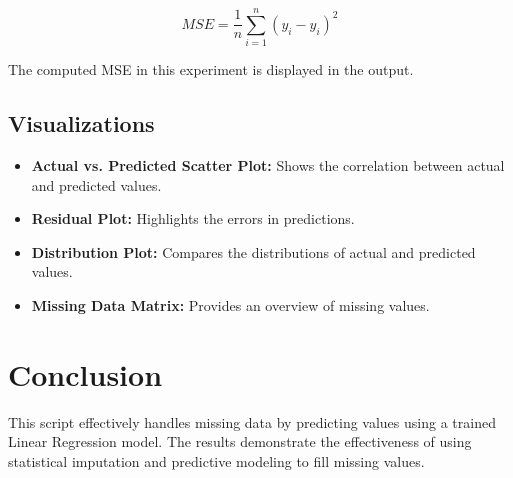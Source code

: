 \documentclass{article}
\begin{document}
\begin{equation}
    MSE = \frac{1}{n} \sum_{i=1}^{n} (y_i - \hat{y}_i)^2
\end{equation}

The computed MSE in this experiment is displayed in the output.

\subsection{Visualizations}
\begin{itemize}
    \item \textbf{Actual vs. Predicted Scatter Plot:} Shows the correlation between actual and predicted values.
    \item \textbf{Residual Plot:} Highlights the errors in predictions.
    \item \textbf{Distribution Plot:} Compares the distributions of actual and predicted values.
    \item \textbf{Missing Data Matrix:} Provides an overview of missing values.
\end{itemize}

\section{Conclusion}
This script effectively handles missing data by predicting values using a trained Linear Regression model. The results demonstrate the effectiveness of using statistical imputation and predictive modeling to fill missing values.
\end{document}
